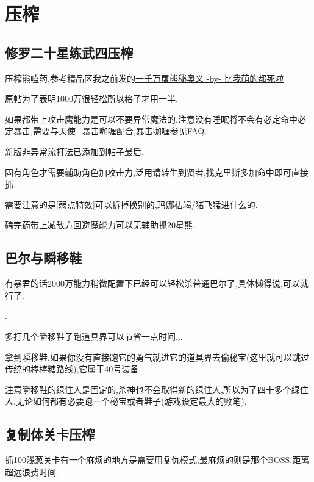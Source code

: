 \newpage

\section{压榨}

	\subsection{修罗二十星练武四压榨}

	压榨熊嗑药,参考精品区我之前发的\href{http://tieba.baidu.com/p/3825275063}{一千万屠熊秘奥义 -by- 比我萌的都死啦}

	原帖为了表明1000万很轻松所以格子才用一半.

	如果都带上攻击魔能力是可以不要异常魔法的,注意没有睡眠将不会有必定命中必定暴击,需要与天使+暴击咖喱配合,暴击咖喱参见FAQ.

	新版非异常流打法已添加到帖子最后.

	固有角色才需要辅助角色加攻击力,泛用请转生到贤者,找克里斯多加命中即可直接抓.

	需要注意的是[弱点特效]可以拆掉换别的,玛娜枯竭/猪飞猛进什么的.

	磕完药带上减敌方回避魔能力可以无辅助抓20星熊.

	\subsection{巴尔与瞬移鞋}

	有暴君的话2000万能力稍微配置下已经可以轻松杀普通巴尔了,具体懒得说,可以就行了.

	{\color{red}{即便没有这里也建议用2000万能力挑战下,整个游戏挑战关已经没几个了,如果觉得困难可以参考后面修罗篇的巴尔攻略}}.

	多打几个瞬移鞋子跑道具界可以节省一点时间...

	拿到瞬移鞋,如果你没有直接跑它的勇气就进它的道具界去偷秘宝(这里就可以跳过传统的棒棒糖路线),它属于40号装备.

	注意瞬移鞋的绿住人是固定的,杀神也不会取得新的绿住人,所以为了四十多个绿住人,无论如何都有必要跑一个秘宝或者鞋子(游戏设定最大的败笔).

	\newpage
	
	\subsection{复制体关卡压榨}

	抓100浅葱关卡有一个麻烦的地方是需要用复仇模式,最麻烦的则是那个BOSS,距离超远浪费时间.

